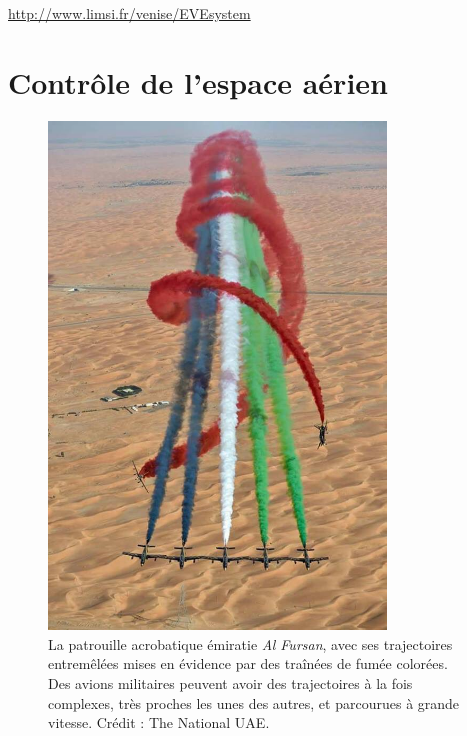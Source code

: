 \begin{appendices}
{	\url{http://www.limsi.fr/venise/EVEsystem}}



\section{Contrôle de l'espace aérien}

	\begin{figure}[htbp]
		\centering
		\includegraphics[width=0.8\textwidth]{figures/ch1/AlFursan}
		\caption[La patrouille acrobatique \emph{Al Fursan}]{La patrouille acrobatique émiratie \emph{Al Fursan}, avec ses trajectoires entremêlées mises en évidence par des traînées de fumée colorées. Des avions militaires peuvent avoir des trajectoires à la fois complexes, très proches les unes des autres, et parcourues à grande vitesse. Crédit : The National UAE.}
		\label{fig:alfursan}
	\end{figure}


\end{appendices}
